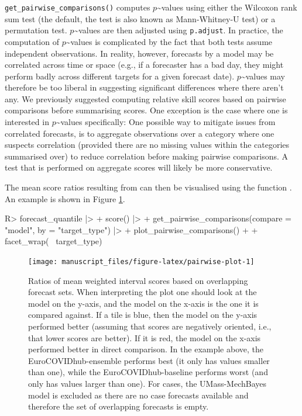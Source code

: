 \documentclass[
]{jss}
\begin{document}
\texttt{get\_pairwise\_comparisons()} computes
\(p\)\textasciitilde values using either the Wilcoxon rank sum test (the
default, the test is also known as Mann-Whitney-U test)
\citep{mannTestWhetherOne1947} or a permutation test.
\(p\)\textasciitilde values are then adjusted using \texttt{p.adjust}.
In practice, the computation of \(p\)\textasciitilde values is
complicated by the fact that both tests assume independent observations.
In reality, however, forecasts by a model may be correlated across time
or space (e.g., if a forecaster has a bad day, they might perform badly
across different targets for a given forecast date).
\(p\)\textasciitilde values may therefore be too liberal in suggesting
significant differences where there aren't any. We previously suggested
computing relative skill scores based on pairwise comparisons before
summarising scores. One exception is the case where one is interested in
\(p\)\textasciitilde values specifically: One possible way to mitigate
issues from correlated forecasts, is to aggregate observations over a
category where one suspects correlation (provided there are no missing
values within the categories summarised over) to reduce correlation
before making pairwise comparisons. A test that is performed on
aggregate scores will likely be more conservative.

The mean score ratios resulting from  can
then be visualised using the function
. An example is shown in Figure
\ref{fig:pairwise-plot}.

\begin{CodeChunk}
\begin{CodeInput}
R> forecast_quantile |>
+   score() |>
+   get_pairwise_comparisons(compare = "model", by = "target_type") |>
+   plot_pairwise_comparisons() + 
+   facet_wrap(~ target_type)
\end{CodeInput}
\begin{figure}

{\centering \texttt{[image: manuscript\_files/figure-latex/pairwise-plot-1]} 

}

\caption[Ratios of mean weighted interval scores based on overlapping forecast sets]{Ratios of mean weighted interval scores based on overlapping forecast sets. When interpreting the plot one should look at the model on the y-axis, and the model on the x-axis is the one it is compared against. If a tile is blue, then the model on the y-axis performed better (assuming that scores are negatively oriented, i.e., that lower scores are better). If it is red, the model on the x-axis performed better in direct comparison. In the example above, the EuroCOVIDhub-ensemble performs best (it only has values smaller than one), while the EuroCOVIDhub-baseline performs worst (and only has values larger than one). For cases, the UMass-MechBayes model is excluded as there are no case forecasts available and therefore the set of overlapping forecasts is empty.}\label{fig:pairwise-plot}
\end{figure}
\end{CodeChunk}
\end{document}
